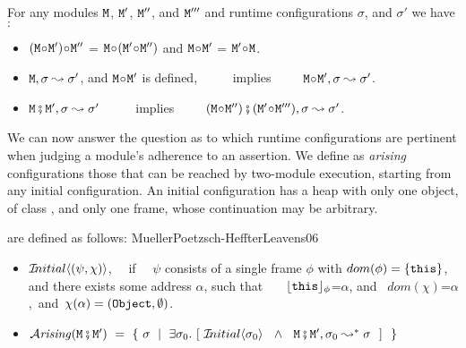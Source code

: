 \begin{lemma}
 For any modules $\M$,   $\M'$, $\M''$, and $\M'''$ and runtime configurations $\sigma$, and $\sigma'$ we have$:$
 \label{lemma:linking:properties}

 \begin{itemize}
     \item
     $(\M \link \M')\link \M''$ = $\M \link (\M' \link \M'')$  \hspace{1cm} and    \hspace{1cm}   $\M \link \M'$  = $\M' \link\M$.
      \item
      $\M, \sigma \leadsto \sigma'$, and $\M\link \M'$ is defined, \  \ \ \ \  implies\ \ \ \ \   $\M\link \M', \sigma \leadsto \sigma'$.
 \item
 $\M \mkpair \M', \sigma \leadsto \sigma'$   \  \ \ \ \  implies\ \ \ \ \  $(\M\link\M'') \mkpair (\M'\link\M''') ,\sigma \leadsto \sigma'$.  
  \end{itemize}

 \end{lemma}
 
 We can now answer the question as to which runtime configurations are pertinent when judging a module's
adherence to an assertion.
We define as  {\em arising} configurations those that can be reached by two-module execution, starting from any initial configuration.
An initial configuration has a heap with only one object, of class , and only one frame, whose continuation may be arbitrary.
 
\begin{definition} are defined as follows: \label{defn:iniial-and-arising}
MuellerPoetzsch-HeffterLeavens06
\begin{itemize}
     \item
   $\Initial {(\psi,\chi)}$, \ \ if \ \ $\psi$ consists of a single frame $\phi$ with $dom(\phi)=\{ \this \}$, and there exists  some address $\alpha$, such that \ \ \    $\interp {\this}{\phi}$=$\alpha$, and \ $dom(\chi)$=$\alpha$,\  and\  
    $\chi(\alpha)=(\prg{Object},\emptyset)$.
 \item
 $\Arising  {\M\mkpair\M'} \ = \ \{ \ \sigma \ \mid \ \exists \sigma_0. \ [\  \Initial{\sigma_0} \  \ \wedge\ \  \M\mkpair\M', \sigma_0 \leadsto^* \sigma \ \ ] \ \ \} $
 \end{itemize}

\end{definition}

 


